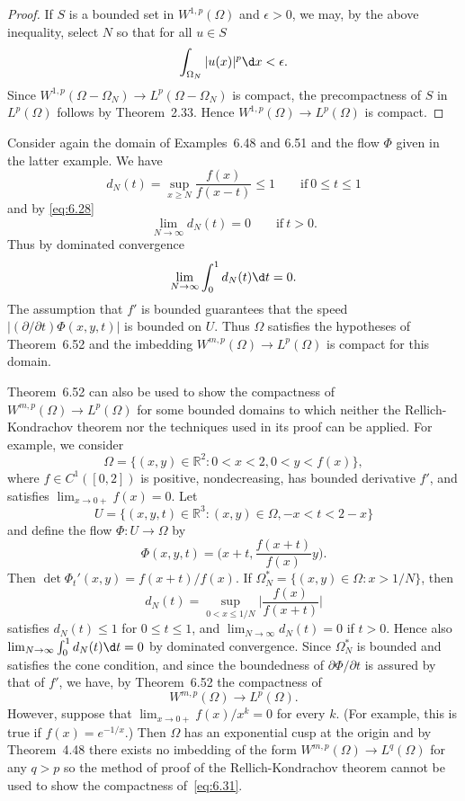 \begin{proof}
  If $S$ is a bounded set in $W^{1,p}(\Omega)$ and $\epsilon>0$, we may,
  by the above inequality, select $N$ so that for all $u\in S$
  \[ \int_{\Omega_N} |u(x)|^p \d x < \epsilon. \]
  Since $W^{1,p}(\Omega-\Omega_N) \to L^p(\Omega-\Omega_N)$ is compact,
  the precompactness of $S$ in $L^p(\Omega)$ follows by Theorem~2.33.
  Hence $W^{1,p}(\Omega)\to L^p(\Omega)$ is compact.
\end{proof}


\begin{example}
  Consider again the domain of Examples~6.48 and 6.51 and the flow $\Phi$
  given in the latter example. We have
  \[ d_N(t) = \sup_{x\geq N} \frac{f(x)}{f(x-t)} \leq 1 \qquad \text{if}\ 0\leq t\leq 1 \]
  and by \eqref{eq:6.28}
  \[ \lim_{N\to\infty} d_N(t) = 0 \qquad \text{if}\ t>0. \]
  Thus by dominated convergence
  \[ \lim_{N\to\infty} \int_0^1 d_N(t) \d t = 0. \]
  The assumption that $f'$ is bounded guarantees that the speed
  $|(\partial/\partial t)\Phi(x,y,t)|$ is bounded on $U$.
  Thus $\Omega$ satisfies the hypotheses of Theorem~6.52 and the
  imbedding $W^{m,p}(\Omega)\to L^p(\Omega)$ is compact for this domain.
\end{example}


\begin{example}
  Theorem~6.52 can also be used to show the compactness of $W^{m,p}(\Omega)\to L^p(\Omega)$
  for some bounded domains to which neither the Rellich-Kondrachov theorem
  nor the techniques used in its proof can be applied. For example, we consider
  \[ \Omega = \{(x,y)\in\mathbb{R}^2: 0<x<2, 0<y<f(x)\}, \]
  where $f\in C^1([0,2])$ is positive, nondecreasing, has bounded derivative $f'$,
  and satisfies $\lim_{x\to 0+}f(x)=0$. Let
  \[ U = \{(x,y,t)\in\mathbb{R}^3: (x,y)\in\Omega, -x<t<2-x\} \]
  and define the flow $\Phi: U\to\Omega$ by
  \[ \Phi(x,y,t) = \biggl(x+t, \frac{f(x+t)}{f(x)}y\biggr). \]
  Then $\det\Phi_t'(x,y) = f(x+t)/f(x)$. If $\Omega_N^* = \{(x,y)\in\Omega: x>1/N\}$, then
  \[ d_N(t) = \sup_{0<x\leq 1/N} \biggl|\frac{f(x)}{f(x+t)}\biggr| \]
  satisfies $d_N(t)\leq 1$ for $0\leq t\leq 1$, and $\lim_{N\to\infty} d_N(t) = 0$
  if $t>0$. Hence also $\lim_{N\to\infty} \int_0^1 d_N(t) \d t=0$
  by dominated convergence. Since $\Omega_N^*$ is bounded and satisfies
  the cone condition, and since the boundedness of $\partial\Phi/\partial t$
  is assured by that of $f'$, we have, by Theorem~6.52 the compactness of
  \begin{equation}\label{eq:6.31}
    W^{m,p}(\Omega) \to L^p(\Omega).
  \end{equation}
  However, suppose that $\lim_{x\to 0+} f(x)/x^k = 0$ for every $k$.
  (For example, this is true if $f(x)=e^{-1/x}$.) Then $\Omega$ has an exponential
  cusp at the origin and by Theorem~4.48 there exists no imbedding of the form
  $W^{m,p}(\Omega)\to L^q(\Omega)$ for any $q>p$ so the method of proof of the
  Rellich-Kondrachov theorem cannot be used to show the compactness of~\eqref{eq:6.31}.
\end{example}


